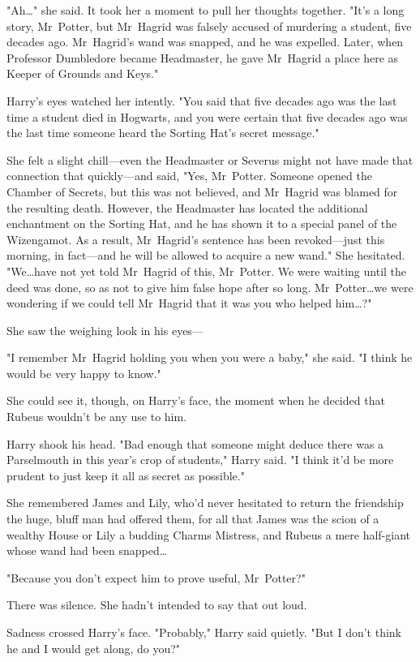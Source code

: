 "Ah…" she said. It took her a moment to pull her thoughts together.
"It’s a long story, Mr~Potter, but Mr~Hagrid was falsely accused of murdering
a student, five decades ago. Mr~Hagrid’s wand was snapped, and he was
expelled. Later, when Professor Dumbledore became Headmaster, he gave
Mr~Hagrid a place here as Keeper of Grounds and Keys."

Harry’s eyes watched her intently. "You said that five decades ago was the last
time a student died in Hogwarts, and you were certain that five decades ago was
the last time someone heard the Sorting Hat’s secret message."

She felt a slight chill—even the Headmaster or Severus might not have made
that connection that quickly—and said, "Yes, Mr~Potter. Someone opened the
Chamber of Secrets, but this was not believed, and Mr~Hagrid was blamed for
the resulting death. However, the Headmaster has located the additional
enchantment on the Sorting Hat, and he has shown it to a special panel of the
Wizengamot. As a result, Mr~Hagrid’s sentence has been revoked—just this
morning, in fact—and he will be allowed to acquire a new wand." She
hesitated. "We…have not yet told Mr~Hagrid of this, Mr~Potter. We
were waiting until the deed was done, so as not to give him false hope after so
long. Mr~Potter…we were wondering if we could tell Mr~Hagrid that it
was you who helped him…?"

She saw the weighing look in his eyes—

"I remember Mr~Hagrid holding you when you were a baby," she said. "I think he
would be very happy to know."

She could see it, though, on Harry’s face, the moment when he decided that
Rubeus wouldn’t be any use to him.

Harry shook his head. "Bad enough that someone might deduce there was a
Parselmouth in this year’s crop of students," Harry said. "I think it’d be more
prudent to just keep it all as secret as possible."

She remembered James and Lily, who’d never hesitated to return the friendship
the huge, bluff man had offered them, for all that James was the scion of a
wealthy House or Lily a budding Charms Mistress, and Rubeus a mere half-giant
whose wand had been snapped…

"Because you don’t expect him to prove useful, Mr~Potter?"

There was silence. She hadn’t intended to say that out loud.

Sadness crossed Harry’s face. "Probably," Harry said quietly. "But I don’t
think he and I would get along, do you?"

